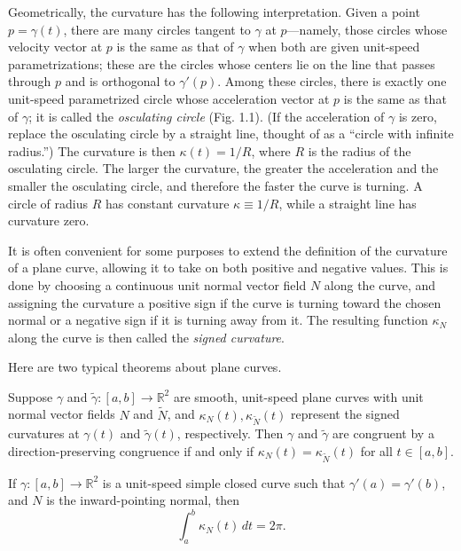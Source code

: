 Geometrically, the curvature has the following interpretation. Given a point $p = \gamma(t)$, there are many circles tangent to $\gamma$ at $p$—namely, those circles whose velocity vector at $p$ is the same as that of $\gamma$ when both are given unit-speed parametrizations; these are the circles whose centers lie on the line that passes through $p$ and is orthogonal to $\gamma'(p)$. Among these circles, there is exactly one unit-speed parametrized circle whose acceleration vector at $p$ is the same as that of $\gamma$; it is called the \emph{osculating circle} (Fig. 1.1). (If the acceleration of $\gamma$ is zero, replace the osculating circle by a straight line, thought of as a ``circle with infinite radius.'') The curvature is then $\kappa(t) = 1/R$, where $R$ is the radius of the osculating circle. The larger the curvature, the greater the acceleration and the smaller the osculating circle, and therefore the faster the curve is turning. A circle of radius $R$ has constant curvature $\kappa \equiv 1/R$, while a straight line has curvature zero.

It is often convenient for some purposes to extend the definition of the curvature of a plane curve, allowing it to take on both positive and negative values. This is done by choosing a continuous unit normal vector field $N$ along the curve, and assigning the curvature a positive sign if the curve is turning toward the chosen normal or a negative sign if it is turning away from it. The resulting function $\kappa_N$ along the curve is then called the \emph{signed curvature}.

Here are two typical theorems about plane curves.

\begin{theorem}
\label{thm:plane-curve-classification}
\notready
Suppose $\gamma$ and $\tilde{\gamma}: [a,b] \to \mathbb{R}^2$ are smooth, unit-speed plane curves with unit normal vector fields $N$ and $\tilde{N}$, and $\kappa_N(t), \kappa_{\tilde{N}}(t)$ represent the signed curvatures at $\gamma(t)$ and $\tilde{\gamma}(t)$, respectively. Then $\gamma$ and $\tilde{\gamma}$ are congruent by a direction-preserving congruence if and only if $\kappa_N(t) = \kappa_{\tilde{N}}(t)$ for all $t \in [a,b]$.
\end{theorem}

\begin{theorem}
\label{thm:total-curvature}
\notready
If $\gamma: [a,b] \to \mathbb{R}^2$ is a unit-speed simple closed curve such that $\gamma'(a) = \gamma'(b)$, and $N$ is the inward-pointing normal, then
\[
\int_a^b \kappa_N(t) \, dt = 2\pi.
\]
\end{theorem}

